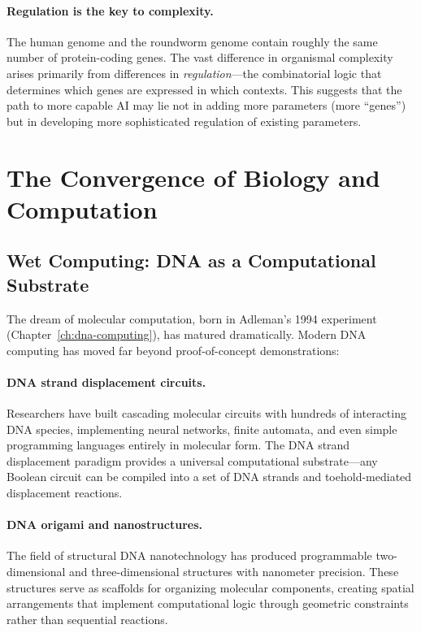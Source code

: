 \paragraph{Regulation is the key to complexity.} The human genome and the roundworm genome contain roughly the same number of protein-coding genes. The vast difference in organismal complexity arises primarily from differences in \emph{regulation}---the combinatorial logic that determines which genes are expressed in which contexts. This suggests that the path to more capable AI may lie not in adding more parameters (more ``genes'') but in developing more sophisticated regulation of existing parameters.

\section{The Convergence of Biology and Computation}
\label{sec:convergence}

\subsection{Wet Computing: DNA as a Computational Substrate}

The dream of molecular computation, born in Adleman's 1994 experiment (Chapter~\ref{ch:dna-computing}), has matured dramatically. Modern DNA computing has moved far beyond proof-of-concept demonstrations:

\paragraph{DNA strand displacement circuits.} Researchers have built cascading molecular circuits with hundreds of interacting DNA species, implementing neural networks, finite automata, and even simple programming languages entirely in molecular form. The DNA strand displacement paradigm provides a universal computational substrate---any Boolean circuit can be compiled into a set of DNA strands and toehold-mediated displacement reactions.

\paragraph{DNA origami and nanostructures.} The field of structural DNA nanotechnology has produced programmable two-dimensional and three-dimensional structures with nanometer precision. These structures serve as scaffolds for organizing molecular components, creating spatial arrangements that implement computational logic through geometric constraints rather than sequential reactions.


